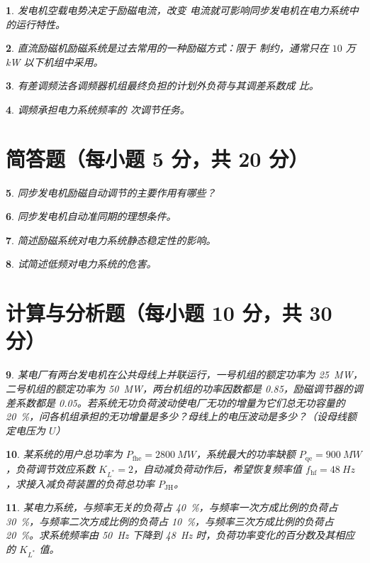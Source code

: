 \documentclass[twocolumn]{ctexart}
\theoremstyle{plain}
\newtheorem{ti}{}[section]
\def\hua#1{\CJKunderline*[hidden = true]{占#1位}}
\begin{document}
	\begin{ti}
		发电机空载电势决定于励磁电流，改变 \hua{励磁} 电流就可影响同步发电机在电力系统中的运行特性。
	\end{ti}

	\begin{ti}
		直流励磁机励磁系统是过去常用的一种励磁方式：限于 \hua{换相} 制约，通常只在 $10$ 万 \si{kW} 以下机组中采用。
	\end{ti}

	\begin{ti}
		有差调频法各调频器机组最终负担的计划外负荷与其调差系数成 \hua{反} 比。
	\end{ti}

	\begin{ti}
		调频承担电力系统频率的 \hua{二} 次调节任务。
	\end{ti}

	\section{简答题（每小题 5 分，共 20 分）}
	\begin{ti}
		同步发电机励磁自动调节的主要作用有哪些？
	\end{ti}

	\begin{ti}
		同步发电机自动准同期的理想条件。
	\end{ti}

	\begin{ti}
		简述励磁系统对电力系统静态稳定性的影响。
	\end{ti}

	\begin{ti}
		试简述低频对电力系统的危害。
	\end{ti}

	\section{计算与分析题（每小题 10 分，共 30 分）}
	\begin{ti}
		某电厂有两台发电机在公共母线上并联运行，一号机组的额定功率为 \SI{25}{MW}，二号机组的额定功率为 \SI{50}{MW}，两台机组的功率因数都是 \num{0.85}，励磁调节器的调差系数都是 \num{0.05}。若系统无功负荷波动使电厂无功的增量为它们总无功容量的 \SI{20}{\percent}，问各机组承担的无功增量是多少？母线上的电压波动是多少？（设母线额定电压为 $U$）
	\end{ti}

	\begin{ti}
		某系统的用户总功率为 $P_{\mathrm{fhe}} = \SI{2800}{MW}$，系统最大的功率缺额 $P_{\mathrm{qe}} = \SI{900}{MW}$，负荷调节效应系数 $K_{L^{*}} = 2$，自动减负荷动作后，希望恢复频率值 $f_{\mathrm{hf}} = \SI{48}{Hz}$，求接入减负荷装置的负荷总功率 $P_{\mathrm{JH}}$。
	\end{ti}

	\begin{ti}
		某电力系统，与频率无关的负荷占 \SI{40}{\percent}，与频率一次方成比例的负荷占 \SI{30}{\percent}，与频率二次方成比例的负荷占 \SI{10}{\percent}，与频率三次方成比例的负荷占 \SI{20}{\percent}。求系统频率由 \SI{50}{Hz} 下降到 \SI{48}{Hz} 时，负荷功率变化的百分数及其相应的 $K_{L^{*}}$ 值。
	\end{ti}
\end{document}
